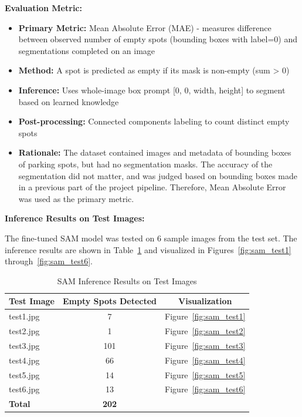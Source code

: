 \documentclass[12pt,a4paper]{article}
\begin{document}
\textbf{Evaluation Metric:}
\begin{itemize}
    \item \textbf{Primary Metric:} Mean Absolute Error (MAE) - measures difference between observed number of empty spots (bounding boxes with label=0) and segmentations completed on an image
    \item \textbf{Method:} A spot is predicted as empty if its mask is non-empty (sum > 0)
    \item \textbf{Inference:} Uses whole-image box prompt [0, 0, width, height] to segment based on learned knowledge
    \item \textbf{Post-processing:} Connected components labeling to count distinct empty spots
    \item \textbf{Rationale:} The dataset contained images and metadata of bounding boxes of parking spots, but had no segmentation masks. The accuracy of the segmentation did not matter, and was judged based on bounding boxes made in a previous part of the project pipeline. Therefore, Mean Absolute Error was used as the primary metric.
\end{itemize}

\textbf{Inference Results on Test Images:}

The fine-tuned SAM model was tested on 6 sample images from the test set. The inference results are shown in Table~\ref{tab:sam_inference_results} and visualized in Figures~\ref{fig:sam_test1} through~\ref{fig:sam_test6}.

\begin{table}[H]
\centering
\caption{SAM Inference Results on Test Images}
\label{tab:sam_inference_results}
\begin{tabular}{@{}lcc@{}}
\toprule
\textbf{Test Image} & \textbf{Empty Spots Detected} & \textbf{Visualization} \\
\midrule
test1.jpg & 7 & Figure~\ref{fig:sam_test1} \\
test2.jpg & 1 & Figure~\ref{fig:sam_test2} \\
test3.jpg & 101 & Figure~\ref{fig:sam_test3} \\
test4.jpg & 66 & Figure~\ref{fig:sam_test4} \\
test5.jpg & 14 & Figure~\ref{fig:sam_test5} \\
test6.jpg & 13 & Figure~\ref{fig:sam_test6} \\
\midrule
\textbf{Total} & \textbf{202} & \\
\bottomrule
\end{tabular}
\end{table}
\end{document}
